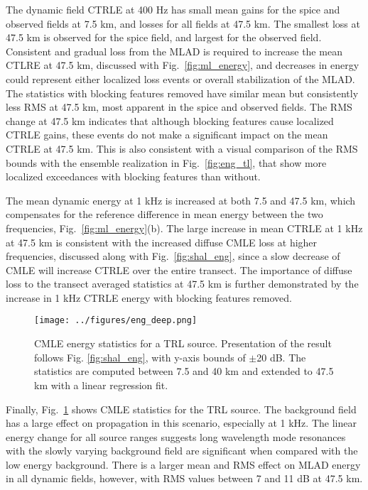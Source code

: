 \documentclass[preprint,NumberedRefs]{JASA}
\begin{document}
The dynamic field CTRLE at 400 Hz has small mean gains for the spice and observed fields at 7.5 km, and losses for all fields at 47.5 km. The smallest loss at 47.5 km is observed for the spice field, and largest for the observed field. Consistent and gradual loss from the MLAD is required to increase the mean CTLRE at 47.5 km, discussed with Fig.~\ref{fig:ml_energy}, and decreases in energy could represent either localized loss events or overall stabilization of the MLAD. The statistics with blocking features removed have similar mean but consistently less RMS at 47.5 km, most apparent in the spice and observed fields. The RMS change at 47.5 km indicates that although blocking features cause localized CTRLE gains, these events do not make a significant impact on the mean CTRLE at 47.5 km. This is also consistent with a visual comparison of the RMS bounds with the ensemble realization in Fig.~\ref{fig:eng_tl}, that show more localized exceedances with blocking features than without.

The mean dynamic energy at 1 kHz is increased at both 7.5 and 47.5 km, which compensates for the reference difference in mean energy between the two frequencies, Fig.~\ref{fig:ml_energy}(b). The large increase in mean CTRLE at 1 kHz at 47.5 km is consistent with the increased diffuse CMLE loss at higher frequencies, discussed along with Fig.~\ref{fig:shal_eng}, since a slow decrease of CMLE will increase CTRLE over the entire transect. The importance of diffuse loss to the transect averaged statistics at 47.5 km is further demonstrated by the increase in 1 kHz CTRLE energy with blocking features removed.

\begin{figure}
\texttt{[image: ../figures/eng\_deep.png]}
    \caption{CMLE energy statistics for a TRL source. Presentation of the result follows Fig. \ref{fig:shal_eng}, with y-axis bounds of $\pm$20 dB. The statistics are computed between 7.5 and 40 km and extended to 47.5 km with a linear regression fit.}
    \label{fig:deep_eng}
\end{figure}
Finally, Fig.~\ref{fig:deep_eng} shows CMLE statistics for the TRL source. The background field has a large effect on propagation in this scenario, especially at 1 kHz. The linear energy change for all source ranges suggests long wavelength mode resonances with the slowly varying background field\cite{colosi21} are significant when compared with the low energy background. There is a larger mean and RMS effect on MLAD energy in all dynamic fields, however, with RMS values between 7 and 11 dB at 47.5 km.
\end{document}

